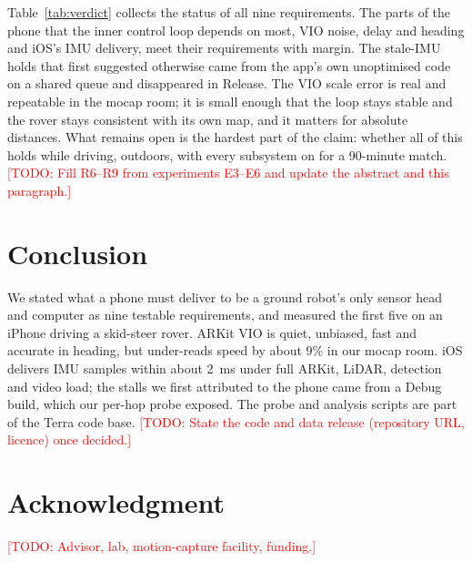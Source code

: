 \documentclass[conference]{IEEEtran}
\newcommand{\todo}[1]{\textcolor{red}{[TODO: #1]}}
\begin{document}
Table~\ref{tab:verdict} collects the status of all nine requirements.
The parts of the phone that the inner control loop depends on most, VIO noise, delay and heading and iOS's IMU delivery, meet their requirements with margin.
The stale-IMU holds that first suggested otherwise came from the app's own unoptimised code on a shared queue and disappeared in Release.
The VIO scale error is real and repeatable in the mocap room; it is small enough that the loop stays stable and the rover stays consistent with its own map, and it matters for absolute distances.
What remains open is the hardest part of the claim: whether all of this holds while driving, outdoors, with every subsystem on for a 90-minute match.
\todo{Fill R6--R9 from experiments E3--E6 and update the abstract and this paragraph.}

\section{Conclusion}
\label{sec:conclusion}

We stated what a phone must deliver to be a ground robot's only sensor head and computer as nine testable requirements, and measured the first five on an iPhone driving a skid-steer rover.
ARKit VIO is quiet, unbiased, fast and accurate in heading, but under-reads speed by about 9\% in our mocap room.
iOS delivers IMU samples within about 2~ms under full ARKit, LiDAR, detection and video load; the stalls we first attributed to the phone came from a Debug build, which our per-hop probe exposed.
The probe and analysis scripts are part of the Terra code base.
\todo{State the code and data release (repository URL, licence) once decided.}

\section*{Acknowledgment}
\todo{Advisor, lab, motion-capture facility, funding.}



\end{document}
